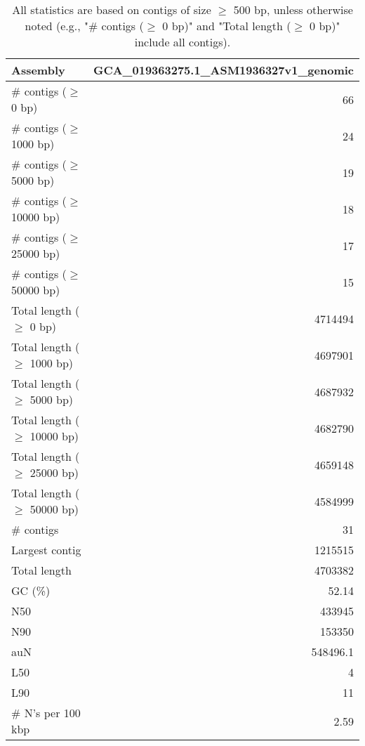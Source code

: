 \documentclass[12pt,a4paper]{article}
\begin{document}
\begin{table}[ht]
\begin{center}
\caption{All statistics are based on contigs of size $\geq$ 500 bp, unless otherwise noted (e.g., "\# contigs ($\geq$ 0 bp)" and "Total length ($\geq$ 0 bp)" include all contigs).}
\begin{tabular}{|l*{1}{|r}|}
\hline
Assembly & GCA\_019363275.1\_ASM1936327v1\_genomic \\ \hline
\# contigs ($\geq$ 0 bp) & 66 \\ \hline
\# contigs ($\geq$ 1000 bp) & 24 \\ \hline
\# contigs ($\geq$ 5000 bp) & 19 \\ \hline
\# contigs ($\geq$ 10000 bp) & 18 \\ \hline
\# contigs ($\geq$ 25000 bp) & 17 \\ \hline
\# contigs ($\geq$ 50000 bp) & 15 \\ \hline
Total length ($\geq$ 0 bp) & 4714494 \\ \hline
Total length ($\geq$ 1000 bp) & 4697901 \\ \hline
Total length ($\geq$ 5000 bp) & 4687932 \\ \hline
Total length ($\geq$ 10000 bp) & 4682790 \\ \hline
Total length ($\geq$ 25000 bp) & 4659148 \\ \hline
Total length ($\geq$ 50000 bp) & 4584999 \\ \hline
\# contigs & 31 \\ \hline
Largest contig & 1215515 \\ \hline
Total length & 4703382 \\ \hline
GC (\%) & 52.14 \\ \hline
N50 & 433945 \\ \hline
N90 & 153350 \\ \hline
auN & 548496.1 \\ \hline
L50 & 4 \\ \hline
L90 & 11 \\ \hline
\# N's per 100 kbp & 2.59 \\ \hline
\end{tabular}
\end{center}
\end{table}
\end{document}
